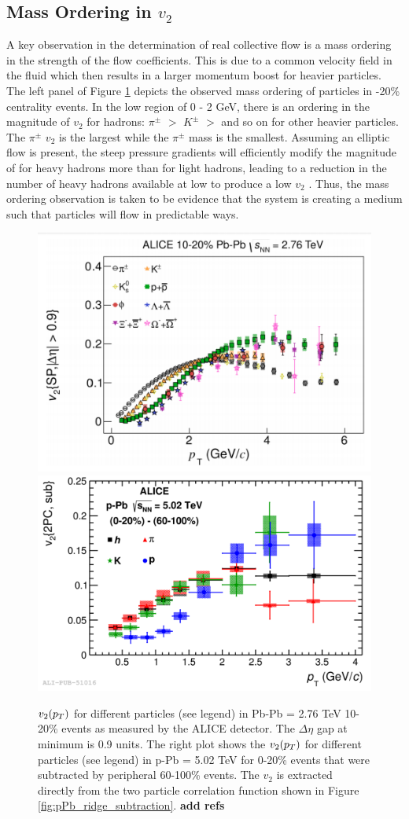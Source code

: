 \subsection{Mass Ordering in $v_2$}
A key observation in the determination of real collective flow is a mass ordering in the strength of the flow coefficients. This is due to a common velocity field in the fluid which then results in a larger momentum boost for heavier particles. The left panel of Figure \ref{fig:PbpPb_mass_ordering} depicts the observed mass ordering of particles in -20\% centrality events. In the low \pt region of 0 - 2 GeV, there is an ordering in the magnitude of $v_2$ for hadrons: $\pi^{\pm}$ $>$ $K^{\pm}$ $>$ \ppbar and so on for other heavier particles. The $\pi^{\pm}$ $v_2$ is the largest while the $\pi^{\pm}$ mass is the smallest. Assuming an elliptic flow is present, the steep pressure gradients will efficiently modify the magnitude of \pt for heavy hadrons more than for light hadrons, leading to a reduction in the number of heavy hadrons available at low \pt to produce a low \pt $v_2$ \cite{PhysRevC.77.044909}. Thus, the mass ordering observation is taken to be evidence that the system is creating a medium such that particles will flow in predictable ways.

\begin{figure}[h!]
\begin{center}
\includegraphics[width=0.48\linewidth]{figs/PbPb_v2_mass_ordering.PNG}
\includegraphics[width=0.48\linewidth]{figs/pPb_two_part_v2_mass_ordering.PNG}
\caption{$v_2(\mbox{$p_T$})$ for different particles (see legend) in Pb-Pb \sqsn = 2.76 TeV 10-20\% events as measured by the ALICE detector. The $\Delta\eta$ gap at minimum is 0.9 units. The right plot shows the $v_2(\mbox{$p_T$})$ for different particles (see legend) in p-Pb \sqsn = 5.02 TeV for 0-20\% events that were subtracted by peripheral 60-100\% events. The $v_2$ is extracted directly from the two particle correlation function shown in Figure \ref{fig:pPb_ridge_subtraction}. \textbf{add refs}}
\label{fig:PbpPb_mass_ordering}
\end{center}
\end{figure}

